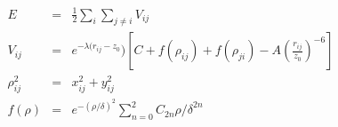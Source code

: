 \documentclass[12pt]{article}
\begin{document}
\begin{eqnarray*}
  E & = & \frac{1}{2} \sum_i \sum_{j \neq i} V_{ij} \\
  V_{ij} & = & e^{-\lambda(r_{ij} -z_0}) \left[ C + f(\rho_{ij}) + f(\rho_{ji}) - A \left( \frac{r_{ij}}{z_0}\right)^{-6}\right] \\
  \rho_{ij}^2 & = & x_{ij}^2 + y_{ij}^2 \\
  f(\rho) & = &  e^{-(\rho/\delta)^2} \sum_{n=0}^2 C_{2n} { \rho/\delta }^{2n}
\end{eqnarray*}
\end{document}
